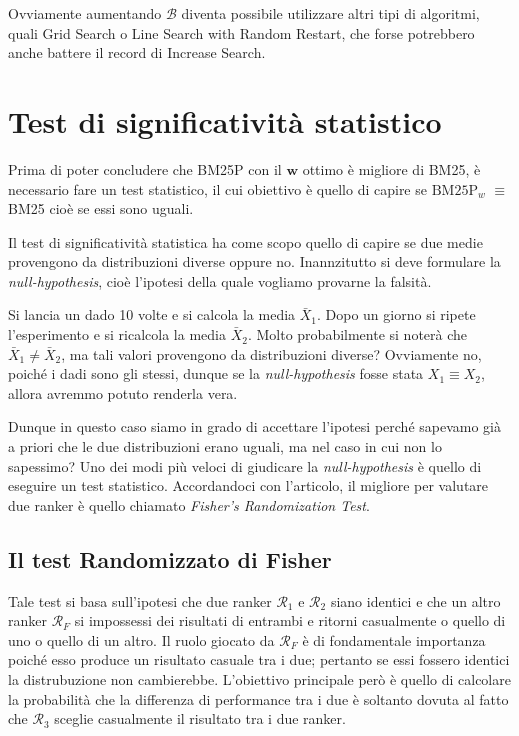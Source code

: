 Ovviamente aumentando $\mathcal{B}$ diventa possibile utilizzare altri
tipi di algoritmi, quali Grid Search o Line Search with Random Restart, che
forse potrebbero anche battere il record di Increase Search.

\section{Test di significatività statistico}

Prima di poter concludere che BM25P con il $\boldsymbol{w}$ ottimo è migliore di BM25, è necessario
fare un test statistico, il cui obiettivo è quello di capire se $\text{BM25P}_w$ $\equiv$ BM25
cioè se essi sono uguali.

Il test di significatività statistica ha come scopo
quello di capire se due medie provengono da distribuzioni diverse oppure no.
Inannzitutto si deve formulare la \textit{null-hypothesis}, cioè l'ipotesi
della quale vogliamo provarne la falsità.

\begin{esempio}
	Si lancia un dado 10 volte e si calcola la media $\bar{X}_1$. Dopo un giorno si ripete l'esperimento
	e si ricalcola la media $\bar{X}_2$. Molto probabilmente si noterà che $\bar{X}_1 \neq \bar{X}_2$,
	ma tali valori provengono da distribuzioni diverse?
	Ovviamente no, poiché i dadi sono gli stessi, dunque se la \textit{null-hypothesis} fosse
	stata $X_1 \equiv X_2$, allora avremmo potuto renderla vera.
\end{esempio}

Dunque in questo caso siamo in grado di accettare l'ipotesi perché
sapevamo già a priori che le due distribuzioni erano uguali, ma nel caso
in cui non lo sapessimo?
Uno dei modi più veloci di giudicare la \textit{null-hypothesis} è quello di eseguire un test statistico.
Accordandoci con l'articolo\cite{10.1145/1321440.1321528}, il migliore per valutare
due ranker è quello chiamato \textit{Fisher's Randomization Test}.

\subsection{Il test Randomizzato di Fisher}
Tale test si basa sull'ipotesi che due ranker $\mathcal{R}_1 $ e $\mathcal{R}_2$ siano identici
e che un altro ranker $\mathcal{R}_F$ si impossessi dei risultati di entrambi e
ritorni casualmente o quello di uno o quello di un altro.
Il ruolo giocato da $\mathcal{R}_F$ è di fondamentale importanza poiché esso produce un risultato
casuale tra i due; pertanto se essi fossero identici la distrubuzione non cambierebbe.
L'obiettivo principale però è quello di calcolare la probabilità che la differenza
di performance tra i due è soltanto dovuta al fatto che $\mathcal{R}_3$ sceglie casualmente
il risultato tra i due ranker.

